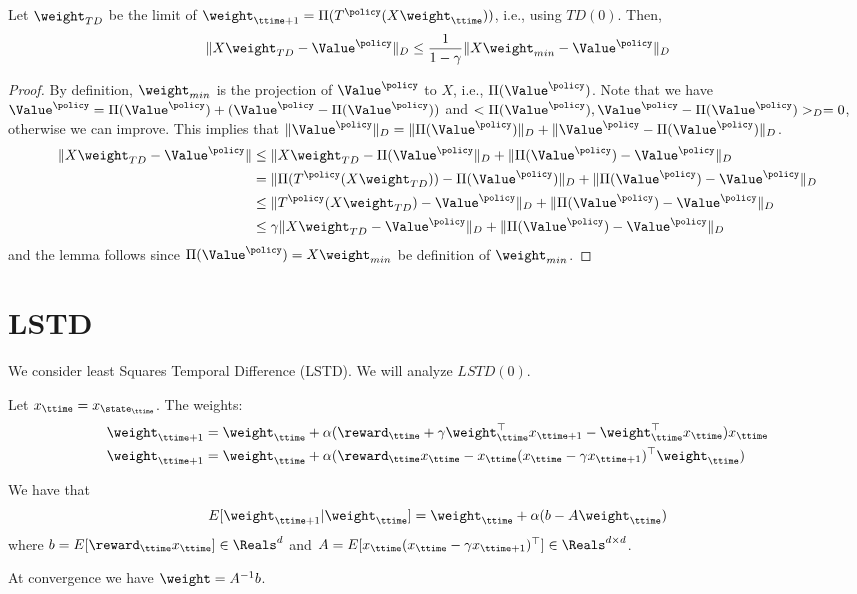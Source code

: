 \begin{leftbar}
\begin{lemma}
Let $\weight_{TD}$ be the limit of
$\weight_{\ttime+1}=\Pi(T^\policy(X\weight_\ttime))$, i.e., using
$TD(0)$. Then,
\[
\|X\weight_{TD}-\Value^\policy\|_D\leq
\frac{1}{1-\gamma}\|X\weight_{min}-\Value^\policy\|_D
\]
\end{lemma}

\begin{proof}
By definition, $\weight_{min}$ is the projection of $\Value^\policy$
to $X$, i.e., $\Pi(\Value^\policy)$. Note that we have
$\Value^\policy=
\Pi(\Value^\policy)+(\Value^\policy-\Pi(\Value^\policy))$ and
$<\Pi(\Value^\policy),\Value^\policy-\Pi(\Value^\policy)>_D=0$,
otherwise we can improve. This implies that
$\|\Value^\policy\|_D=\|\Pi(\Value^\policy)\|_D+\|\Value^\policy-\Pi(\Value^\policy)\|_D$.
\begin{align*}
\|X\weight_{TD}-\Value^\policy\| &\leq
\|X\weight_{TD}-\Pi(\Value^\policy\|_D+\|\Pi(\Value^\policy)-\Value^\policy\|_D\\
&= \|\Pi(T^\policy(X\weight_{TD}))-\Pi(\Value^\policy)\|_D+\|\Pi(\Value^\policy)-\Value^\policy\|_D\\
&\leq \|T^\policy(X\weight_{TD})-\Value^\policy\|_D+\|\Pi(\Value^\policy)-\Value^\policy\|_D\\
&\leq \gamma \|X\weight_{TD}-\Value^\policy\|_D+\|\Pi(\Value^\policy)-\Value^\policy\|_D\\
\end{align*}
and the lemma follows since $\Pi(\Value^\policy)=X\weight_{min}$ be
definition of $\weight_{min}$.
\end{proof}


\section{LSTD}


We consider least Squares Temporal Difference (LSTD). We will
analyze $LSTD(0)$.

Let $x_\ttime=x_{\state_\ttime}$. The weights:
\begin{align*}
\weight_{\ttime+1} &= \weight_\ttime +\alpha (\reward_\ttime+\gamma
\weight_\ttime^\top x_{\ttime+1}-\weight_\ttime^\top
x_\ttime)x_\ttime\\
\weight_{\ttime+1} &= \weight_\ttime +\alpha (\reward_\ttime
x_\ttime-x_\ttime(x_\ttime-\gamma x_{\ttime+1})^\top \weight_\ttime)
\end{align*}

We have that
\[
E[\weight_{\ttime+1}|\weight_\ttime]=\weight_\ttime +\alpha
(b-A\weight_\ttime)
\]
where $b=E[\reward_\ttime x_\ttime]\in \Reals^d$ and
$A=E[x_\ttime(x_\ttime-\gamma x_{\ttime+1})^\top]\in\Reals^{d\times
d}$.

At convergence we have $\weight=A^{-1}b$.

\end{leftbar}
